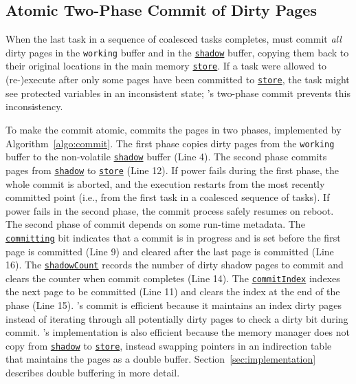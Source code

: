 
%

\subsection{Atomic Two-Phase Commit of Dirty Pages}

When the last task in a sequence of coalesced tasks completes, \sys must commit
\emph{all} dirty pages in the \texttt{working} buffer and in the
\texttt{\underline{shadow}} buffer, copying them back to their original
locations in the main memory \texttt{\underline{store}}. If a task were allowed
to (re-)execute after only some pages have been committed to
\texttt{\underline{store}}, the task might see protected variables in an
inconsistent state; \sys's two-phase commit prevents this inconsistency.

To make the commit atomic, \sys commits the pages in two phases, implemented by
Algorithm~\ref{algo:commit}.
%
The first phase copies dirty pages from the \texttt{working} buffer to the
non-volatile \texttt{\underline{shadow}} buffer (Line 4). The second phase
commits pages from \texttt{\underline{shadow}} to \texttt{\underline{store}}
(Line 12).  If power fails during the first phase, the whole commit is aborted,
and the execution restarts from the most recently committed point (i.e., from
the first task in a coalesced sequence of tasks). If power fails in the second
phase, the commit process safely resumes on reboot.  The second phase of commit
depends on some run-time metadata. The \texttt{\underline{committing}} bit
indicates that a commit is in progress and is set before the first page is
committed (Line 9) and cleared after the last page is committed (Line 16).  The
\texttt{\underline{shadowCount}} records the number of dirty shadow pages to
commit and \sys clears the counter when commit completes (Line 14).  The
\texttt{\underline{commitIndex}} indexes the next page to be committed (Line
11) and \sys clears the index at the end of the phase (Line 15).
%
\sys's commit is efficient because it maintains an index dirty pages instead of
iterating through all potentially dirty pages to check a dirty bit during
commit.
%
\sys's implementation is also efficient because the memory manager does not
copy from \texttt{\underline{shadow}} to \texttt{\underline{store}}, instead
swapping pointers in an indirection table that maintains the pages as a double
buffer.  Section~\ref{sec:implementation} describes double buffering in more
detail.

